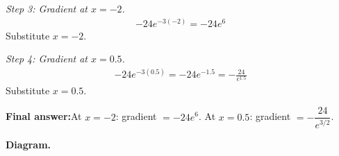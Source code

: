 \documentclass[11pt]{article}
\begin{document}
\textit{Step 3: Gradient at \( x = -2 \).}
\[\begin{gathered}
-24e^{-3(-2)} = -24e^{6}
\end{gathered}\]
Substitute \( x = -2 \).

\textit{Step 4: Gradient at \( x = 0.5 \).}
\[\begin{gathered}
-24e^{-3(0.5)} = -24e^{-1.5} = -\frac{24}{e^{1.5}}
\end{gathered}\]
Substitute \( x = 0.5 \).

\begin{answerbox}
\textbf{Final answer:}\quad At \(\displaystyle  x = -2 \): gradient \(\displaystyle  = -24e^6 \). At \(\displaystyle  x = 0.5 \): gradient \(\displaystyle  = -\dfrac{24}{e^{3/2}} \).
\end{answerbox}
\textbf{Diagram.}
\end{document}
